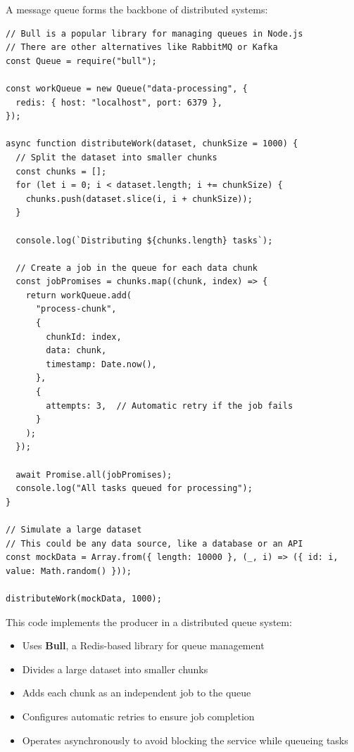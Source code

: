 A message queue forms the backbone of distributed systems:

\begin{macterminal}
\begin{lstlisting}
// Bull is a popular library for managing queues in Node.js
// There are other alternatives like RabbitMQ or Kafka
const Queue = require("bull");

const workQueue = new Queue("data-processing", {
  redis: { host: "localhost", port: 6379 },
});

async function distributeWork(dataset, chunkSize = 1000) {
  // Split the dataset into smaller chunks
  const chunks = [];
  for (let i = 0; i < dataset.length; i += chunkSize) {
    chunks.push(dataset.slice(i, i + chunkSize));
  }

  console.log(`Distributing ${chunks.length} tasks`);

  // Create a job in the queue for each data chunk
  const jobPromises = chunks.map((chunk, index) => {
    return workQueue.add(
      "process-chunk",
      {
        chunkId: index,
        data: chunk,
        timestamp: Date.now(),
      },
      {
        attempts: 3,  // Automatic retry if the job fails
      }
    );
  });

  await Promise.all(jobPromises);
  console.log("All tasks queued for processing");
}

// Simulate a large dataset
// This could be any data source, like a database or an API
const mockData = Array.from({ length: 10000 }, (_, i) => ({ id: i, value: Math.random() }));

distributeWork(mockData, 1000);
\end{lstlisting}
\end{macterminal}

This code implements the producer in a distributed queue system:
\begin{itemize}
    \item Uses \textbf{\textcolor{accentColor}{Bull}}, a Redis-based library for queue management
    \item Divides a large dataset into smaller chunks
    \item Adds each chunk as an independent job to the queue
    \item Configures automatic retries to ensure job completion
    \item Operates asynchronously to avoid blocking the service while queueing tasks
\end{itemize}

